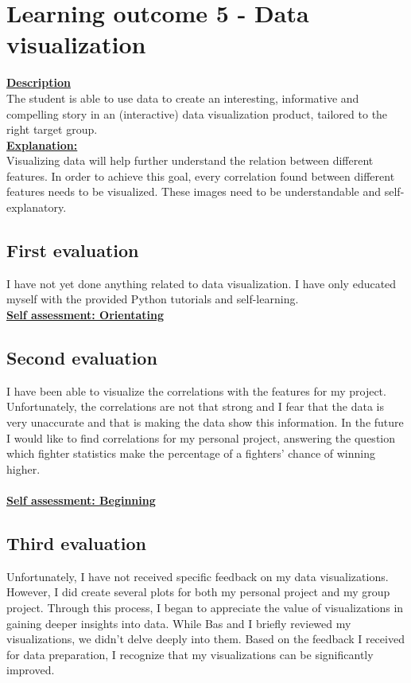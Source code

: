 \documentclass{article}
\begin{document}
\section{Learning outcome 5 - Data visualization}
\underline{\textbf{Description}}\\
The student is able to use data to create an interesting, informative and 
compelling story in an (interactive) data visualization product, tailored to the right target group.\\
\underline{\textbf{Explanation:}}\\
Visualizing data will help further understand the relation between different features. In order to achieve this goal,
every correlation found between different features needs to be visualized. These images need to be understandable and 
self-explanatory.

\subsection{First evaluation}
I have not yet done anything related to data visualization. I have only educated myself with the provided Python tutorials and self-learning.\\
\underline{\textbf{Self assessment: Orientating}}

\subsection{Second evaluation}
I have been able to visualize the correlations with the features for my project. Unfortunately, the correlations are not that strong and I fear that 
the data is very unaccurate and that is making the data show this information. In the future I would like to find correlations for my personal project, answering 
the question which fighter statistics make the percentage of a fighters' chance of winning higher. \\\\
\underline{\textbf{Self assessment: Beginning}}

\subsection{Third evaluation}
Unfortunately, I have not received specific feedback on my data visualizations. However, I did create several plots for both my personal project and my group project. Through this process, I began to appreciate the value of visualizations in gaining deeper insights into data. While Bas and I briefly reviewed my visualizations, we didn’t delve deeply into them. Based on the feedback I received for data preparation, I recognize that my visualizations can be significantly improved.\\
\end{document}
